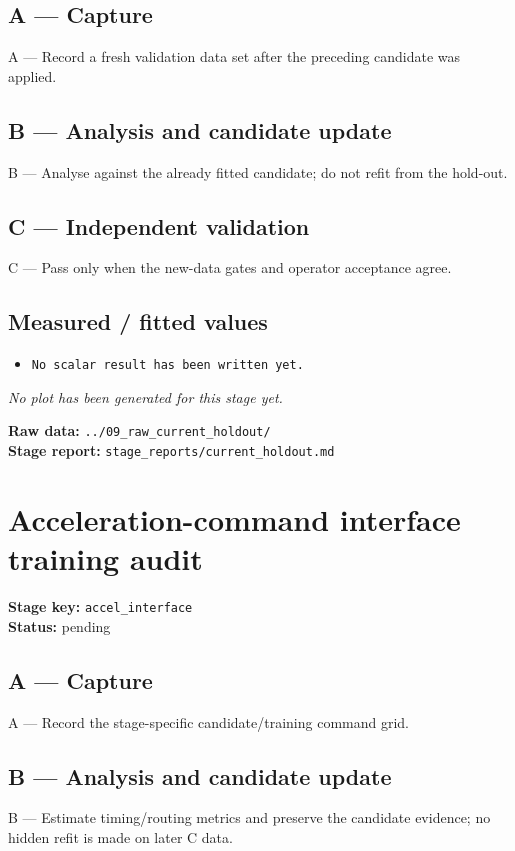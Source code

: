 \documentclass[11pt,a4paper]{article}
\begin{document}
\subsection*{A --- Capture}
A — Record a fresh validation data set after the preceding candidate was applied.

\subsection*{B --- Analysis and candidate update}
B — Analyse against the already fitted candidate; do not refit from the hold-out.

\subsection*{C --- Independent validation}
C — Pass only when the new-data gates and operator acceptance agree.

\subsection*{Measured / fitted values}
\begin{itemize}\setlength\itemsep{0pt}
\item \texttt{No scalar result has been written yet.}
\end{itemize}

\textit{No plot has been generated for this stage yet.}

\vfill
\textbf{Raw data:} \texttt{../09\_raw\_current\_holdout/}\\
\textbf{Stage report:} \texttt{stage\_reports/current\_holdout.md}
\clearpage
\small
\section*{Acceleration-command interface training audit}
\textbf{Stage key:} \texttt{accel\_interface}\\
\textbf{Status:} pending\\

\subsection*{A --- Capture}
A — Record the stage-specific candidate/training command grid.

\subsection*{B --- Analysis and candidate update}
B — Estimate timing/routing metrics and preserve the candidate evidence; no hidden refit is made on later C data.
\end{document}
